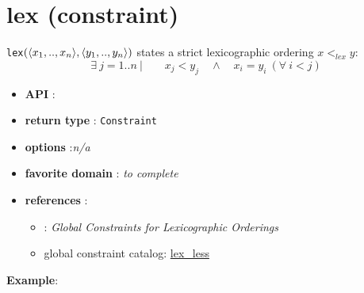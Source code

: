 \label{lex}
\hypertarget{lex}{}

\section{lex (constraint)}\label{lex:lexconstraint}\hypertarget{lex:lexconstraint}{}
\begin{notedef}
  \texttt{lex}$(\langle x_1,..,x_n\rangle,\langle y_1,..,y_n\rangle)$ states a strict lexicographic ordering  $x <_{lex} y$:
$$\exists\ j=1..n\ |\qquad x_j<y_j\quad \land\quad x_i=y_i\ (\forall\  i<j)$$
\end{notedef}

\begin{itemize}
	\item \textbf{API} : 
	\item \textbf{return type} : \texttt{Constraint}
	\item \textbf{options} :\emph{n/a}
	\item \textbf{favorite domain} : \emph{to complete}
	\item \textbf{references} :
      \begin{itemize}
      \item \cite{FrischCP02}: \emph{Global Constraints for Lexicographic Orderings}
      \item global constraint catalog: \href{http://www.emn.fr/x-info/sdemasse/gccat/Clex_less.html}{lex\_less}
      \end{itemize}
\end{itemize}

\textbf{Example}:


